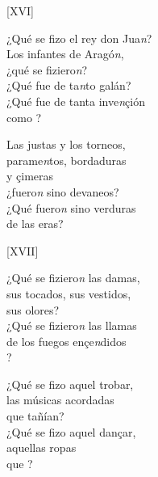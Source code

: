 \documentclass[11pt,a4paper,twoside]{article}
\begin{document}
\begin{center}
	[XVI]
\end{center}
\pstart
¿Qué se fizo el rey don Jua\emph{n}?\\
Los infantes de Aragó\emph{n},\\
¿qué se fiziero\emph{n}?\\
¿Qué fue de ta\emph{n}to galán?\\
¿Qué fue de tanta inve\emph{n}çión\\
como ?\par
Las justas y los torneos,\\
parame\emph{n}tos, bordaduras\\
y çimeras\\
¿fuero\emph{n} sino devaneos?\\
¿Qué fuero\emph{n} sino verduras\\
de las eras?\par
\pend

\begin{center}
	[XVII]
\end{center}
\pstart
¿Qué se fiziero\emph{n} las damas,\\
sus tocados, sus vestidos,\\
sus olores?\\
¿Qué se fiziero\emph{n} las llamas\\
de los fuegos ençe\emph{n}didos\\
?\par
¿Qué se fizo aquel trobar,\\
las músicas acordadas\\
que tañían?\\
¿Qué se fizo aquel dançar,\\
aquellas ropas \\
que ?\par
\pend
\end{document}
